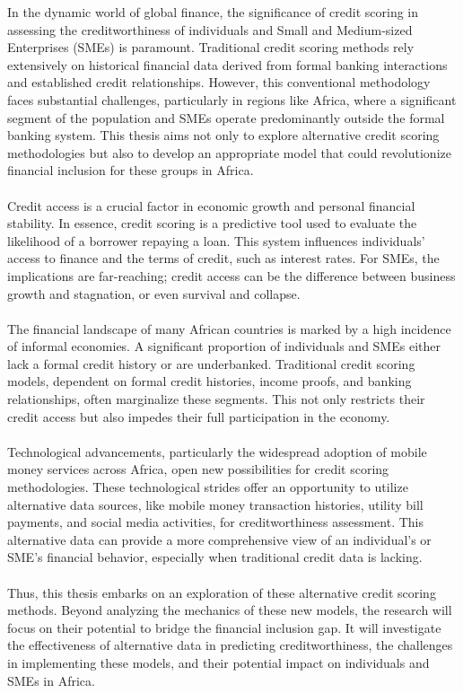 \documentclass[a4paper,11pt,fleqn]{report}
\begin{document}
In the dynamic world of global finance, the significance of credit scoring in assessing the creditworthiness of individuals and Small and Medium-sized Enterprises (SMEs) is paramount. Traditional credit scoring methods rely extensively on historical financial data derived from formal banking interactions and established credit relationships. However, this conventional methodology faces substantial challenges, particularly in regions like Africa, where a significant segment of the population and SMEs operate predominantly outside the formal banking system. This thesis aims not only to explore alternative credit scoring methodologies but also to develop an appropriate model that could revolutionize financial inclusion for these groups in Africa.
\\\\
Credit access is a crucial factor in economic growth and personal financial stability. In essence, credit scoring is a predictive tool used to evaluate the likelihood of a borrower repaying a loan. This system influences individuals' access to finance and the terms of credit, such as interest rates. For SMEs, the implications are far-reaching; credit access can be the difference between business growth and stagnation, or even survival and collapse.
\\\\
The financial landscape of many African countries is marked by a high incidence of informal economies. A significant proportion of individuals and SMEs either lack a formal credit history or are underbanked. Traditional credit scoring models, dependent on formal credit histories, income proofs, and banking relationships, often marginalize these segments. This not only restricts their credit access but also impedes their full participation in the economy.
\\\\
Technological advancements, particularly the widespread adoption of mobile money services across Africa, open new possibilities for credit scoring methodologies. These technological strides offer an opportunity to utilize alternative data sources, like mobile money transaction histories, utility bill payments, and social media activities, for creditworthiness assessment. This alternative data can provide a more comprehensive view of an individual's or SME's financial behavior, especially when traditional credit data is lacking.
\\\\
Thus, this thesis embarks on an exploration of these alternative credit scoring methods. Beyond analyzing the mechanics of these new models, the research will focus on their potential to bridge the financial inclusion gap. It will investigate the effectiveness of alternative data in predicting creditworthiness, the challenges in implementing these models, and their potential impact on individuals and SMEs in Africa.
\end{document}
